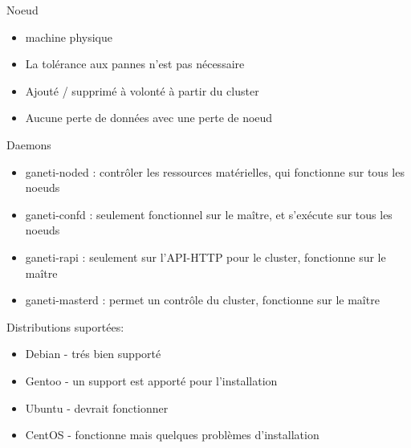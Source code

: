\begin{frame}{Noeud}
\begin{itemize}
\item machine physique

\item La tolérance aux pannes n'est pas nécessaire

\item Ajouté / supprimé à volonté à partir du cluster

\item Aucune perte de données avec une perte de noeud
\end{itemize}
\end{frame}

\begin{frame}{Daemons}
\begin{itemize}
\item ganeti-noded : contrôler les ressources matérielles, qui fonctionne sur tous les noeuds

\item ganeti-confd : seulement fonctionnel sur le maître, et s'exécute sur tous les noeuds

\item ganeti-rapi : seulement sur l'API-HTTP  pour le cluster, fonctionne sur le maître

\item ganeti-masterd :  permet un contrôle du cluster, fonctionne sur le maître
\end{itemize}
\end{frame}



\begin{frame}
Distributions suportées:\\
\begin{itemize}
\item Debian - trés bien supporté
\item Gentoo - un support est apporté pour l'installation
\item Ubuntu - devrait fonctionner
\item CentOS - fonctionne mais quelques problèmes d'installation
\end{itemize}
\end{frame}

